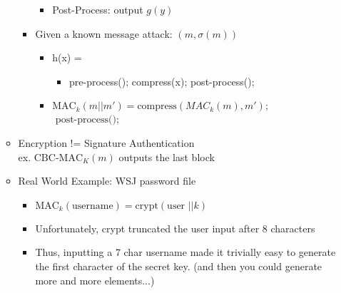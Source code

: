 \begin{itemize}
\begin{itemize}
\begin{itemize}
\begin{itemize}
            \item Post-Process: output $g(y)$  
            \end{itemize}  
        \item Given a known message attack: $(m, \sigma(m))$
            \begin{itemize}
            \item h(x) = 
                \begin{itemize}
                \item pre-process(); compress(x); post-process();
                \end{itemize}
            \item $\text{MAC}_k(m||m') = \text{compress}(MAC_k(m),m');$
                \\$\text{                post-process()}$;
            \end{itemize}
    \end{itemize}  
    \item Encryption != Signature Authentication
        \\ex. $\text{CBC-MAC}_K(m)$ outputs the last block
    \item Real World Example: WSJ password file  
        \begin{itemize}
        \item $\text{MAC}_k(\text{username}) = \text{crypt}(\text{user }||k)$
        \item Unfortunately, crypt truncated the user input after 8 characters
        \item Thus, inputting a 7 char username made it trivially easy to generate the first character of the secret key. (and then you could generate more and more elements...)
        \end{itemize}
    \end{itemize}
\end{itemize}